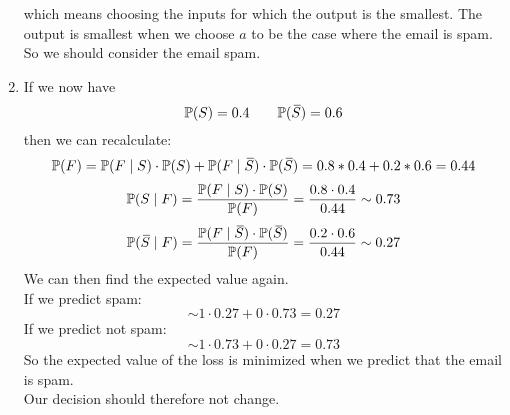 \documentclass[12pt]{article}
\begin{document}
\begin{enumerate}[label=\alph*)]
    which means
    choosing the inputs for which the output
    is the smallest.
    The output is smallest when we choose
    $a$ to be the case where the email is spam. \\
    So we should consider the email spam.
    \item 
    If we now have
    \[ \mathbb{P}(S) = 0.4 \qquad 
    \mathbb{P}(\,\overline{\!{S}}) = 0.6 \]
    then we can recalculate:
    \[\mathbb{P}(F) = \mathbb{P}(F \mid S) \cdot \mathbb{P}(S)
    +  \mathbb{P}(F \mid \,\overline{\!{S}}) \cdot \mathbb{P}(\,\overline{\!{S}})
    = 0.8 * 0.4 + 0.2 * 0.6 = 0.44 \]
    \[ \mathbb{P}(S \mid F)
    = \dfrac{\mathbb{P}(F \mid S) \cdot \mathbb{P}(S)}{\mathbb{P}(F)}
    = \dfrac{0.8 \cdot 0.4}{0.44}
    \sim 0.73 \]
    \[ \mathbb{P}(\,\overline{\!{S}} \mid F)
    = \dfrac{\mathbb{P}(F \mid \,\overline{\!{S}}) \cdot \mathbb{P}(\,\overline{\!{S}})}
    {\mathbb{P}(F)}
    = \dfrac{0.2 \cdot 0.6}{0.44}
    \sim 0.27 \]
    We can then find the expected value again. \\
    If we predict spam:
    \[ \sim 1 \cdot 0.27 + 0 \cdot 0.73 = 0.27  \]
    If we predict not spam:
    \[ \sim 1 \cdot 0.73 + 0 \cdot 0.27 = 0.73  \]
    So the expected value of the loss is minimized
    when we predict that the email is spam. \\
    Our decision should therefore not change. \\
\end{enumerate}
\end{document}
